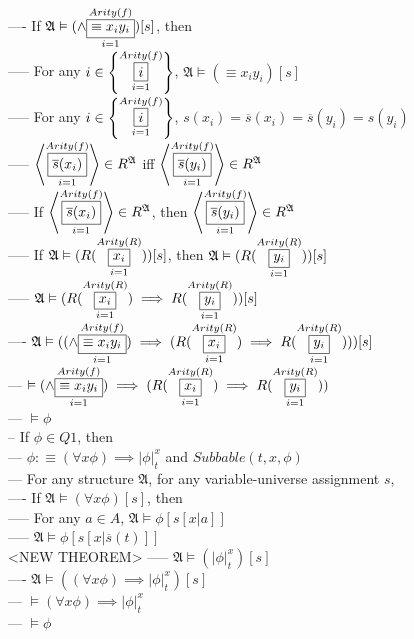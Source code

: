 \documentclass{book}
\newcommand{\is}{:\equiv}
\newcommand{\means}[2]{#1^{#2}}
\newcommand{\extend}[1]{\overline{#1}}
\newcommand{\set}[1]{\left\{ #1 \right\}}
\newcommand{\seq}[1]{\left\langle #1 \right\rangle}
\newcommand{\vdc}[3]{\underset{#2}{\overset{#3}{\fbox{$#1$}}}}
\newcommand{\sub}[3]{\left|#1\right|_{#3}^{#2}}
\begin{document}
				---- If $\mathfrak{A} \vDash (\land \vdc{\equiv x_i y_i}{i=1}{Arity(f)})[s]$, then \\
					----- For any $i \in \set{\vdc{i}{i=1}{Arity(f)}}$, $\mathfrak{A} \vDash (\equiv x_i y_i)[s]$ \\
					----- For any $i \in \set{\vdc{i}{i=1}{Arity(f)}}$, $s(x_i) = \extend{s}(x_i) = \extend{s}(y_i) = s(y_i)$ \\
					----- $\seq{\vdc{\extend{s}(x_i)}{i=1}{Arity(f)}} \in \means{R}{\mathfrak{A}}$ iff $\seq{\vdc{\extend{s}(y_i)}{i=1}{Arity(f)}} \in \means{R}{\mathfrak{A}}$ \\
					----- If $\seq{\vdc{\extend{s}(x_i)}{i=1}{Arity(f)}} \in \means{R}{\mathfrak{A}}$, then $\seq{\vdc{\extend{s}(y_i)}{i=1}{Arity(f)}} \in \means{R}{\mathfrak{A}}$ \\
					----- If $\mathfrak{A} \vDash (R(\vdc{x_i}{i=1}{Arity(R)}))[s]$, then $\mathfrak{A} \vDash (R(\vdc{y_i}{i=1}{Arity(R)}))[s]$ \\
					----- $\mathfrak{A} \vDash (R(\vdc{x_i}{i=1}{Arity(R)}) \implies R(\vdc{y_i}{i=1}{Arity(R)}))[s]$ \\
				---- $\mathfrak{A} \vDash ((\land \vdc{\equiv x_i y_i}{i=1}{Arity(f)}) \implies (R(\vdc{x_i}{i=1}{Arity(R)}) \implies R(\vdc{y_i}{i=1}{Arity(R)})))[s]$ \\
			--- $\vDash (\land \vdc{\equiv x_i y_i}{i=1}{Arity(f)}) \implies (R(\vdc{x_i}{i=1}{Arity(R)}) \implies R(\vdc{y_i}{i=1}{Arity(R)}))$ \\
			--- $\vDash \phi$ \\
		-- If $\phi \in Q1$, then \\
			--- $\phi \is (\forall x \phi) \implies \sub{\phi}{x}{t}$ and $Subbable(t, x, \phi)$ \\
			--- For any structure $\mathfrak{A}$, for any variable-universe assignment $s$, \\
				---- If $\mathfrak{A} \vDash (\forall x \phi)[s]$, then \\
					----- For any $a \in A$, $\mathfrak{A} \vDash \phi[s[x|a]]$ \\
					----- $\mathfrak{A} \vDash \phi[s[x|\extend{s}(t)]]$ \\ <NEW THEOREM>
					----- $\mathfrak{A} \vDash (\sub{\phi}{x}{t})[s]$ \\
				---- $\mathfrak{A} \vDash ((\forall x \phi) \implies \sub{\phi}{x}{t})[s]$ \\
			--- $\vDash (\forall x \phi) \implies \sub{\phi}{x}{t}$ \\
			--- $\vDash \phi$ \\
\end{document}
